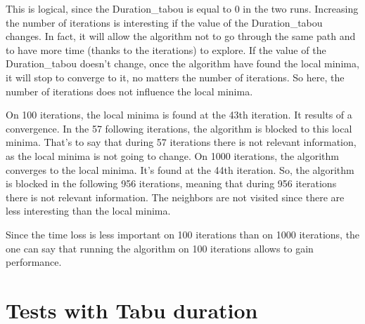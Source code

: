 \documentclass[12pt,oneside,a4paper]{article}
\begin{document}
    This is logical, since the Duration\_tabou is equal to 0 in the two runs. 
    Increasing the number of iterations is interesting if the value of the Duration\_tabou changes. In fact, it will allow the algorithm not to go through the same path 
    and to have more time (thanks to the iterations) to explore.
    If the value of the Duration\_tabou doesn’t change, once the algorithm have found the local minima, it will stop to converge to it, no matters the number of iterations. 
    So here, the number of iterations does not influence the local minima.

    On 100 iterations, the local minima is found at the 43th iteration. It results of a convergence. In the 57 following iterations, the algorithm is blocked to this local minima. That’s to say that 
    during 57 iterations there is not relevant information, as the local minima is not going to change. 
    On 1000 iterations, the algorithm converges to the local minima. It's found at the 44th iteration. So, the algorithm is blocked in the following 956 iterations, meaning that during 
    956 iterations there is not relevant information. The neighbors are not visited since there are less interesting than the local minima.

    Since the time loss is less important on 100 iterations than on 1000 iterations, the one can say that running the algorithm on 100 iterations allows to gain performance.
    
\newpage
\section{Tests with Tabu duration}
\end{document}
